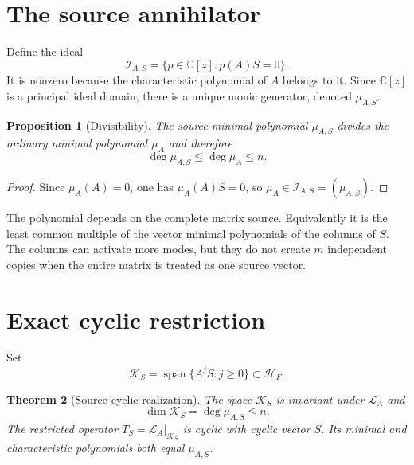 \documentclass[12pt]{article}
\newtheorem{theorem}{Theorem}[section]
\newtheorem{proposition}[theorem]{Proposition}
\theoremstyle{remark}
\newcommand{\cH}{\mathcal H}
\newcommand{\cK}{\mathcal K}
\newcommand{\cL}{\mathcal L}
\begin{document}
\section{The source annihilator}

Define the ideal
\begin{equation}\label{eq:annihilator-ideal}
 \mathcal I_{A,S}=\{p\in\mathbb C[z]:p(A)S=0\}.
\end{equation}
It is nonzero because the characteristic polynomial of $A$ belongs to it.
Since $\mathbb C[z]$ is a principal ideal domain, there is a unique monic
generator, denoted $\mu_{A,S}$.

\begin{proposition}[Divisibility]\label{prop:divisibility}
The source minimal polynomial $\mu_{A,S}$ divides the ordinary minimal
polynomial $\mu_A$ and therefore
\begin{equation}\label{eq:degree-bound}
 \deg\mu_{A,S}\le\deg\mu_A\le n.
\end{equation}
\end{proposition}

\begin{proof}
Since $\mu_A(A)=0$, one has $\mu_A(A)S=0$, so
$\mu_A\in\mathcal I_{A,S}=(\mu_{A,S})$.
\end{proof}

The polynomial depends on the complete matrix source.  Equivalently it is
the least common multiple of the vector minimal polynomials of the columns
of $S$.  The columns can activate more modes, but they do not create $m$
independent copies when the entire matrix is treated as one source vector.

\section{Exact cyclic restriction}

Set
\begin{equation}\label{eq:cyclic-space}
 \cK_S=\operatorname{span}\{A^jS:j\ge0\}\subset\cH_F.
\end{equation}

\begin{theorem}[Source-cyclic realization]\label{thm:cyclic-realization}
The space $\cK_S$ is invariant under $\cL_A$ and
\begin{equation}\label{eq:cyclic-dimension}
 \dim\cK_S=\deg\mu_{A,S}\le n.
\end{equation}
The restricted operator
$T_S=\cL_A|_{\cK_S}$ is cyclic with cyclic vector $S$.  Its minimal and
characteristic polynomials both equal $\mu_{A,S}$.
\end{theorem}
\end{document}
